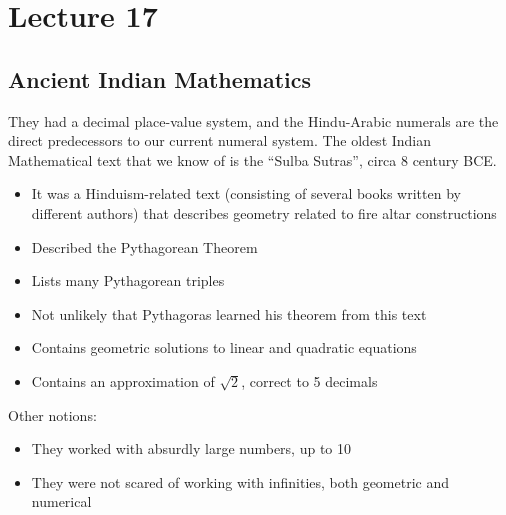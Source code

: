 \documentclass[class=article, crop=false]{standalone}
\begin{document}
  \section{Lecture 17}
  \subsection{Ancient Indian Mathematics}
  They had a decimal place-value system, and the Hindu-Arabic numerals are the direct predecessors to our current numeral system. The oldest Indian Mathematical text that we know of is the ``Sulba Sutras'', circa 8 century BCE.
  \begin{itemize}
    \item It was a Hinduism-related text (consisting of several books written by different authors) that describes geometry related to fire altar constructions
    \item Described the Pythagorean Theorem
    \item Lists many Pythagorean triples
    \item Not unlikely that Pythagoras learned his theorem from this text
    \item Contains geometric solutions to linear and quadratic equations
    \item Contains an approximation of $\sqrt{2}$, correct to 5 decimals
  \end{itemize}
  Other notions:
  \begin{itemize}
    \item They worked with absurdly large numbers, up to 10
    \item They were not scared of working with infinities, both geometric and numerical
  \end{itemize}
\end{document}
